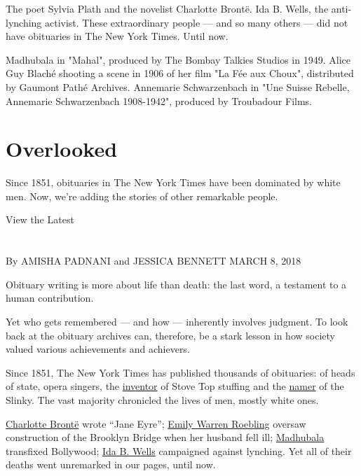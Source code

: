 The poet Sylvia Plath and the novelist Charlotte Brontë. Ida B. Wells,
the anti-lynching activist. These extraordinary people --- and so many
others --- did not have obituaries in The New York Times. Until now.

Madhubala in "Mahal", produced by The Bombay Talkies Studios in 1949.
Alice Guy Blaché shooting a scene in 1906 of her film "La Fée aux
Choux", distributed by Gaumont Pathé Archives. Annemarie Schwarzenbach
in "Une Suisse Rebelle, Annemarie Schwarzenbach 1908-1942", produced by
Troubadour Films.

\hypertarget{overlooked}{%
\section{Overlooked}\label{overlooked}}

Since 1851, obituaries in The New York Times have been dominated by
white men. Now, we're adding the stories of other remarkable people.

\protect\hyperlink{latest}{}

View the Latest

\section{}

By AMISHA PADNANI and JESSICA BENNETT MARCH 8, 2018

Obituary writing is more about life than death: the last word, a
testament to a human contribution.

Yet who gets remembered --- and how --- inherently involves judgment. To
look back at the obituary archives can, therefore, be a stark lesson in
how society valued various achievements and achievers.

Since 1851, The New York Times has published thousands of obituaries: of
heads of state, opera singers, the
\href{https://www.nytimes.com/2005/11/23/us/ruth-m-siems-inventor-of-stuffing-dies-at-74.html}{inventor}
of Stove Top stuffing and the
\href{https://www.nytimes.com/2008/11/25/business/25james.html}{namer}
of the Slinky. The vast majority chronicled the lives of men, mostly
white ones.

\href{https://www.nytimes.com/2018/03/08/obituaries/overlooked-charlotte-bronte.html}{Charlotte
Brontë} wrote ``Jane Eyre''; \href{https://www.nytimes.com}{Emily Warren
Roebling} oversaw construction of the Brooklyn Bridge when her husband
fell ill; \href{https://www.nytimes.com}{Madhubala} transfixed
Bollywood; \href{https://www.nytimes.com}{Ida B. Wells} campaigned
against lynching. Yet all of their deaths went unremarked in our pages,
until now.

